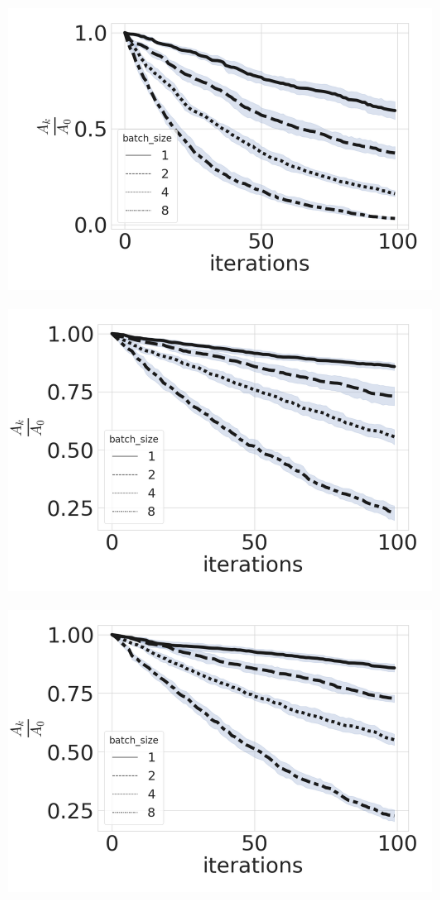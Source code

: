 \documentclass{article}
\begin{document}
\begin{figure}
    \includegraphics[width=120mm]{convergence_0-1.png}
\end{figure}

\begin{figure}
    \includegraphics[width=120mm]{convergence_0-001.png}
\end{figure}


\begin{figure}
    \includegraphics[width=120mm]{convergence_0-0001.png}
\end{figure}
\end{document}
